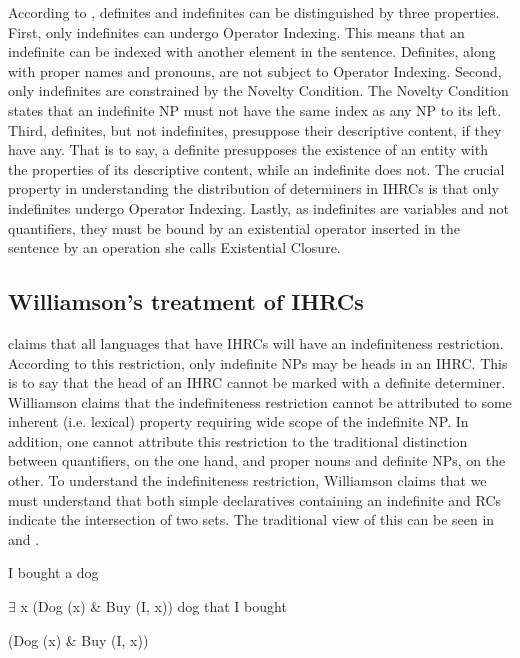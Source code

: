 \documentclass[output=paper]{LSP/langsci}
\begin{document}
According to \citet{Heim1982}, definites and indefinites can be distinguished by three properties. First, only indefinites can undergo Operator Indexing. This means that an indefinite can be indexed with another element in the sentence. Definites, along with proper names and pronouns, are not subject to Operator Indexing. Second, only indefinites are constrained by the Novelty Condition. The Novelty Condition states that an indefinite NP must not have the same index as any NP to its left. Third, definites, but not indefinites, presuppose their descriptive content, if they have any.  That is to say, a definite presupposes the existence of an entity with the properties of its descriptive content, while an indefinite does not. The crucial property in understanding the distribution of determiners in IHRCs is that only indefinites undergo Operator Indexing. Lastly, as indefinites are variables and not quantifiers, they must be bound by an existential operator inserted in the sentence by an operation she calls Existential Closure.

\subsection{Williamson's treatment of IHRCs} 

\citet{Williamson1987} claims that all languages that have IHRCs will have an indefiniteness restriction. According to this restriction, only indefinite NPs may be heads in an IHRC. This is to say that the head of an IHRC cannot be marked with a definite determiner. Williamson claims that the indefiniteness restriction cannot be attributed to some inherent (i.e. lexical) property requiring wide scope of the indefinite NP. In addition, one cannot attribute this restriction to the traditional distinction between quantifiers, on the one hand, and proper nouns and definite NPs, on the other. To understand the indefiniteness restriction, Williamson claims that we must understand that both simple declaratives containing an indefinite and RCs indicate the intersection of two sets. The traditional view of this can be seen in  and .

\ea I bought a dog	\label{boyle40}

$\exists$ x (Dog (x) \& Buy (I, x))
\ex dog that I bought \label{boyle41}

(Dog (x) \& Buy (I, x))
\z	
	
\end{document}

